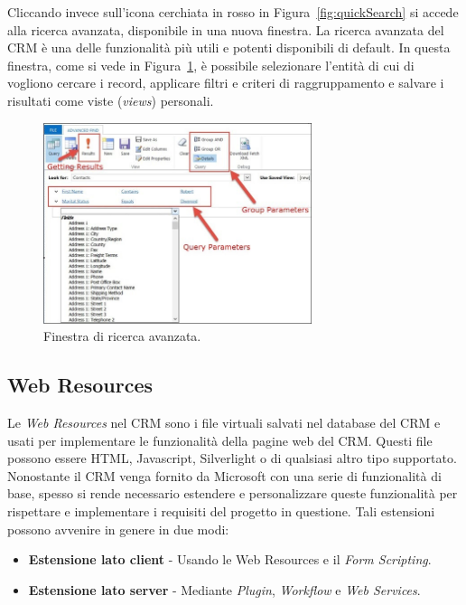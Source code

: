 Cliccando invece sull'icona cerchiata in rosso in Figura~\ref{fig:quickSearch} si accede alla ricerca avanzata, disponibile in una nuova finestra. La ricerca avanzata del CRM è una delle funzionalità più utili e potenti disponibili di default. In questa finestra, come si vede in Figura~\ref{fig:advancedSearch}, è possibile selezionare l'entità di cui di vogliono cercare i record, applicare filtri e criteri di raggruppamento e salvare i risultati come viste (\textit{views}) personali.
\begin{figure}[ht]
  \centering
  \includegraphics[width=0.7\textwidth]{advanced-search.png}
  \caption{Finestra di ricerca avanzata.}
  \label{fig:advancedSearch}
\end{figure}

\subsection{Web Resources}
 Le \textit{Web Resources} nel CRM sono i file virtuali salvati nel database del CRM e usati per implementare le funzionalità della pagine web del CRM. Questi file possono essere HTML, Javascript, Silverlight o di qualsiasi altro tipo supportato. 
 Nonostante il CRM venga fornito da Microsoft con una serie di funzionalità di base, spesso si rende necessario estendere e personalizzare queste funzionalità per rispettare e implementare i requisiti del progetto in questione. Tali estensioni possono avvenire in genere in due modi:
 \begin{itemize}
   \item \textbf{Estensione lato client} - Usando le Web Resources e il \textit{Form Scripting}.
   \item \textbf{Estensione lato server} - Mediante \textit{Plugin}, \textit{Workflow} e \textit{Web Services}.
 \end{itemize}


